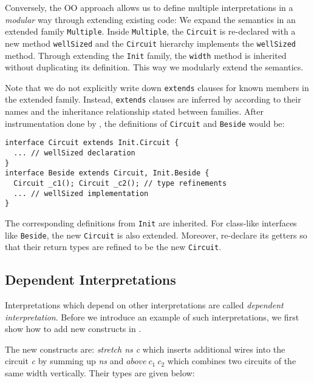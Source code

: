 Conversely, the OO approach allows us to define multiple interpretations in a
\emph{modular} way through extending existing code:
We expand the semantics in an extended family \texttt{Multiple}.
Inside \texttt{Multiple}, the \texttt{Circuit} is re-declared
with a new method \texttt{wellSized} and the \texttt{Circuit} hierarchy
implements the \texttt{wellSized} method.
Through extending the \texttt{Init} family, the \texttt{width} method is
inherited without duplicating its definition. This way we modularly extend the
semantics.

Note that we do not explicitly write down \texttt{extends} clauses for known members in the
extended family.
Instead, \texttt{extends} clauses are inferred by \name according to their
names and the inheritance relationship stated between families.
After instrumentation done by \name, the definitions of \texttt{Circuit} and \texttt{Beside}
would be:

\begin{lstlisting}
interface Circuit extends Init.Circuit {
  ... // wellSized declaration
}
interface Beside extends Circuit, Init.Beside {
  Circuit _c1(); Circuit _c2(); // type refinements
  ... // wellSized implementation
}
\end{lstlisting}
The corresponding definitions from \texttt{Init} are inherited. For class-like
interfaces like \texttt{Beside}, the new \texttt{Circuit} is also extended.
Moreover, \name re-declare its getters so that their return types are refined to be the new \texttt{Circuit}.

\subsection{Dependent Interpretations}
Interpretations which depend on other interpretations are called \emph{dependent
  interpretation}. %
Before we introduce an example of such interpretations, we first show how to add new
constructs in \name.

The new constructs are: \emph{stretch ns c} which inserts additional wires into the circuit \emph{c} by
summing up \emph{ns} and $above\ c_1\ c_2$ which combines two circuits of the same width vertically.
Their types are given below:



